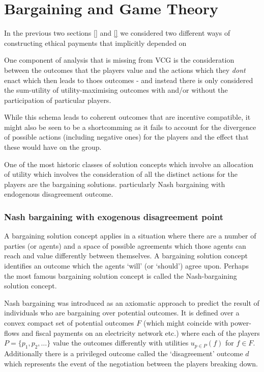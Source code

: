 \section{Bargaining and Game Theory}\label{sec:solutions_bargaining}

In the previous two sections \ref{} and \ref{} we considered two different ways of constructing ethical payments that implicitly depended on

One component of analysis that is missing from VCG is the consideration between the outcomes that the players value and the actions which they \textit{dont} enact which then leads to thoes outcomes - and instead there is only considered the sum-utility of utility-maximising outcomes with and/or without the participation of particular players.

While this schema leads to coherent outcomes that are incentive compatible, it might also be seen to be a shortcomming as it fails to account for the divergence of possible actions (including negative ones) for the players and the effect that these would have on the group.

One of the most historic classes of solution concepts which involve an allocation of utility which involves the consideration of all the distinct actions for the players are the bargaining solutions.
particularly Nash bargaining with endogenous disagreement outcome.

\subsubsection{Nash bargaining with exogenous disagreement point}\label{sec:nash_bargaining_exogenous}

A bargaining solution concept applies in a situation where there are a number of parties (or agents) and a space of possible agreements which those agents can reach and value differently between themselves.
A bargaining solution concept identifies an outcome which the agents `will' (or `should') agree upon.
Perhaps the most famous bargaining solution concept is called the Nash-bargaining solution concept.

Nash bargaining was introduced \cite{nash1} as an axiomatic approach to predict the result of individuals who are bargaining over potential outcomes.
It is defined over a convex compact set of potential outcomes $F$ (which might coincide with power-flows and fiscal payments on an electricity network etc.) 
where each of the players $P=\{p_1,p_2,\dots\}$ value the outcomes differently with utilities $u_{p\in P}(f)$ for $f\in F$.
Additionally there is a privileged outcome called the `disagreement' outcome $d$ which represents the event of the negotiation between the players breaking down.

